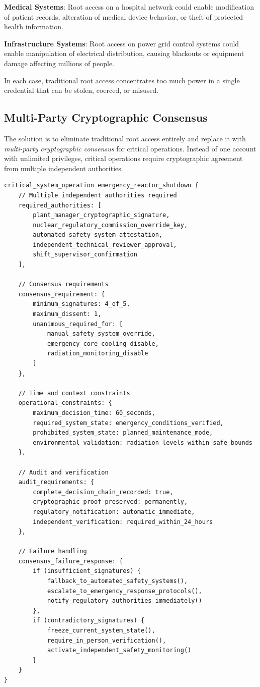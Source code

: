 \textbf{Medical Systems}: Root access on a hospital network could enable modification of patient records, alteration of medical device behavior, or theft of protected health information.

\textbf{Infrastructure Systems}: Root access on power grid control systems could enable manipulation of electrical distribution, causing blackouts or equipment damage affecting millions of people.

In each case, traditional root access concentrates too much power in a single credential that can be stolen, coerced, or misused.

\subsection{Multi-Party Cryptographic Consensus}

The solution is to eliminate traditional root access entirely and replace it with \textit{multi-party cryptographic consensus} for critical operations. Instead of one account with unlimited privileges, critical operations require cryptographic agreement from multiple independent authorities.

\begin{lstlisting}[language=rift, caption=Multi-Party Consensus for Nuclear Plant Emergency Systems]
critical_system_operation emergency_reactor_shutdown {
    // Multiple independent authorities required
    required_authorities: [
        plant_manager_cryptographic_signature,
        nuclear_regulatory_commission_override_key,
        automated_safety_system_attestation,
        independent_technical_reviewer_approval,
        shift_supervisor_confirmation
    ],
    
    // Consensus requirements
    consensus_requirement: {
        minimum_signatures: 4_of_5,
        maximum_dissent: 1,
        unanimous_required_for: [
            manual_safety_system_override,
            emergency_core_cooling_disable,
            radiation_monitoring_disable
        ]
    },
    
    // Time and context constraints
    operational_constraints: {
        maximum_decision_time: 60_seconds,
        required_system_state: emergency_conditions_verified,
        prohibited_system_state: planned_maintenance_mode,
        environmental_validation: radiation_levels_within_safe_bounds
    },
    
    // Audit and verification
    audit_requirements: {
        complete_decision_chain_recorded: true,
        cryptographic_proof_preserved: permanently,
        regulatory_notification: automatic_immediate,
        independent_verification: required_within_24_hours
    },
    
    // Failure handling
    consensus_failure_response: {
        if (insufficient_signatures) {
            fallback_to_automated_safety_systems(),
            escalate_to_emergency_response_protocols(),
            notify_regulatory_authorities_immediately()
        },
        if (contradictory_signatures) {
            freeze_current_system_state(),
            require_in_person_verification(),
            activate_independent_safety_monitoring()
        }
    }
}
\end{lstlisting}

